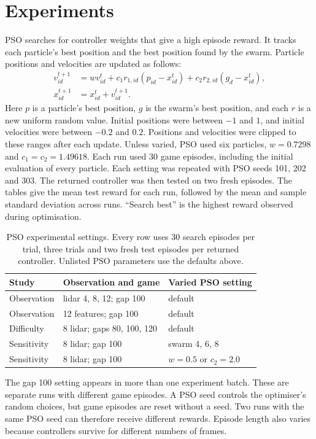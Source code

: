 \documentclass[runningheads]{llncs}
\begin{document}
\section{Experiments}
PSO searches for controller weights that give a high episode reward. It tracks each particle's best position and the best position found by the swarm. Particle positions and velocities are updated as follows:
\begin{align}
v_{id}^{t+1}&=w v_{id}^{t}+c_1r_{1,id}(p_{id}-x_{id}^{t})+c_2r_{2,id}(g_d-x_{id}^{t}),\\
x_{id}^{t+1}&=x_{id}^{t}+v_{id}^{t+1}.
\end{align}
Here $p$ is a particle's best position, $g$ is the swarm's best position, and each $r$ is a new uniform random value. Initial positions were between $-1$ and $1$, and initial velocities were between $-0.2$ and $0.2$. Positions and velocities were clipped to these ranges after each update. Unless varied, PSO used six particles, $w=0.7298$ and $c_1=c_2=1.49618$. Each run used 30 game episodes, including the initial evaluation of every particle. Each setting was repeated with PSO seeds 101, 202 and 303. The returned controller was then tested on two fresh episodes. The tables give the mean test reward for each run, followed by the mean and sample standard deviation across runs. ``Search best'' is the highest reward observed during optimisation.

\begin{table}[t]
\caption{PSO experimental settings. Every row uses 30 search episodes per trial, three trials and two fresh test episodes per returned controller. Unlisted PSO parameters use the defaults above.}
\centering\small
\begin{tabular}{lll}
\toprule
Study & Observation and game & Varied PSO setting \\
\midrule
Observation & lidar 4, 8, 12; gap 100 & default \\
Observation & 12 features; gap 100 & default \\
Difficulty & 8 lidar; gaps 80, 100, 120 & default \\
Sensitivity & 8 lidar; gap 100 & swarm 4, 6, 8 \\
Sensitivity & 8 lidar; gap 100 & $w=0.5$ or $c_2=2.0$ \\
\bottomrule
\end{tabular}
\end{table}
The gap 100 setting appears in more than one experiment batch. These are separate runs with different game episodes. A PSO seed controls the optimiser's random choices, but game episodes are reset without a seed. Two runs with the same PSO seed can therefore receive different rewards. Episode length also varies because controllers survive for different numbers of frames.
\end{document}
